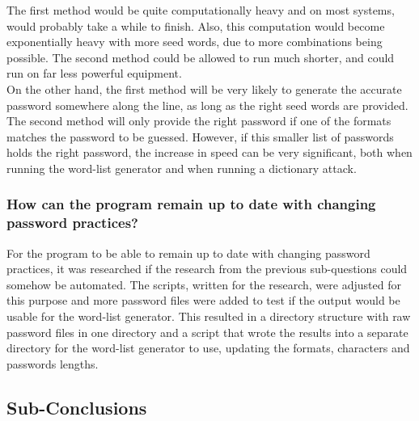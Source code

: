 \documentclass[a4paper,12pt]{article}
\begin{document}
The first method would be quite computationally heavy and on most systems, would probably take a while to finish. Also, this computation would become exponentially heavy with more seed words, due to more combinations being possible. The second method could be allowed to run much shorter, and could run on far less powerful equipment.\\
On the other hand, the first method will be very likely to generate the accurate password somewhere along the line, as long as the right seed words are provided. The second method will only provide the right password if one of the formats matches the password to be guessed. However, if this smaller list of passwords holds the right password, the increase in speed can be very significant, both when running the word-list generator and when running a dictionary attack.

\subsubsection{How can the program remain up to date with changing password practices?}
For the program to be able to remain up to date with changing password practices, it was researched if the research from the previous sub-questions could somehow be automated. The scripts, written for the research, were adjusted for this purpose and more password files were added to test if the output would be usable for the word-list generator. This resulted in a directory structure with raw password files in one directory and a script that wrote the results into a separate directory for the word-list generator to use, updating the formats, characters and passwords lengths.

\subsection{Sub-Conclusions}
\end{document}
